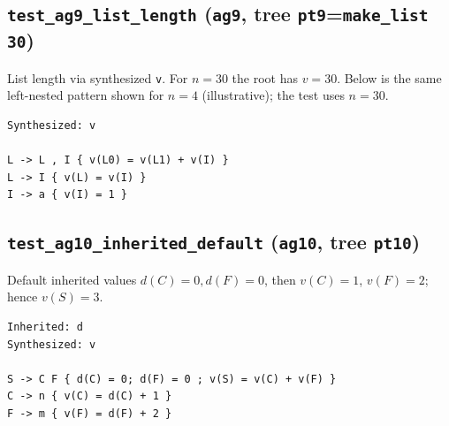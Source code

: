 \subsection{\texttt{test\_ag9\_list\_length} (\texttt{ag9}, tree \texttt{pt9}=\texttt{make\_list 30})}
 List length via synthesized \texttt{v}. For \(n=30\) the root has \(v=30\). Below is the same left-nested pattern shown for \(n=4\) (illustrative); the test uses \(n=30\). 

\begin{verbatim}
Synthesized: v

L -> L , I { v(L0) = v(L1) + v(I) }
L -> I { v(L) = v(I) }
I -> a { v(I) = 1 }
\end{verbatim}





\subsection{\texttt{test\_ag10\_inherited\_default} (\texttt{ag10}, tree \texttt{pt10})}
 Default inherited values \(d(C)=0,d(F)=0\), then \(v(C)=1\), \(v(F)=2\); hence \(v(S)=3\). 

 
\begin{verbatim}
Inherited: d
Synthesized: v

S -> C F { d(C) = 0; d(F) = 0 ; v(S) = v(C) + v(F) }
C -> n { v(C) = d(C) + 1 }
F -> m { v(F) = d(F) + 2 }
\end{verbatim}


